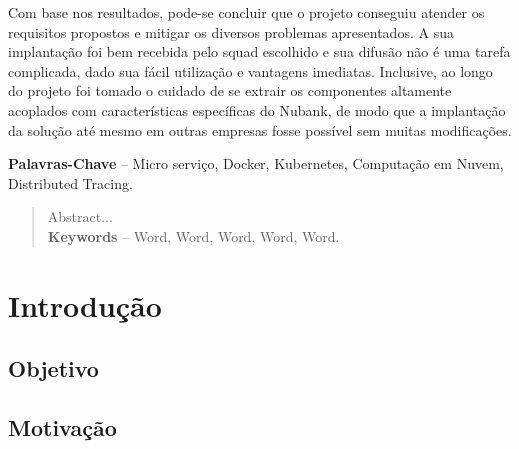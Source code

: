 \documentclass[]{politex}
\begin{document}
\begin{resumo}
	Com base nos resultados, pode-se concluir que o projeto conseguiu atender os requisitos propostos e mitigar os diversos problemas apresentados. A sua implantação foi bem recebida pelo squad escolhido e sua difusão não é uma tarefa complicada, dado sua fácil utilização e vantagens imediatas. Inclusive, ao longo do projeto foi tomado o cuidado de se extrair os componentes altamente acoplados com características específicas do Nubank, de modo que a implantação da solução até mesmo em outras empresas fosse possível sem muitas modificações.
	
%
%
\textbf{Palavras-Chave} -- Micro serviço, Docker, Kubernetes, Computação em Nuvem, Distributed Tracing.
\end{resumo}


\begin{abstract}
Abstract...
%
\\[3\baselineskip]
%
\textbf{Keywords} -- Word, Word, Word, Word, Word.
\end{abstract}






\sumario




	
\chapter{Introdução}
	\section{Objetivo}
	\section{Motivação}
\end{document}
